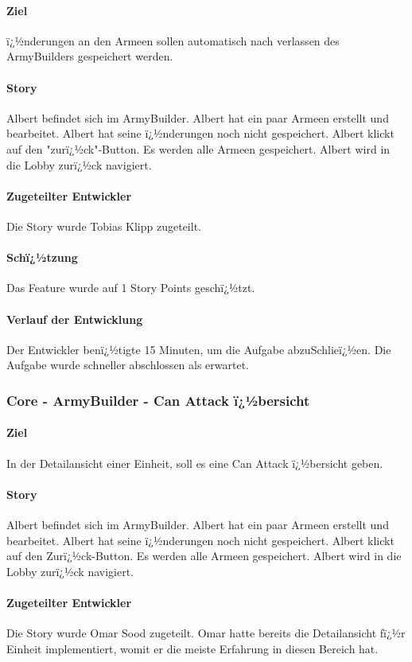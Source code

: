 \documentclass[12pt, titlepage]{scrartcl}
\begin{document}
			\paragraph{Ziel} ï¿½nderungen an den Armeen sollen automatisch nach verlassen des ArmyBuilders gespeichert werden.
			\paragraph{Story} Albert befindet sich im ArmyBuilder. Albert hat ein paar Armeen erstellt und bearbeitet. Albert hat seine ï¿½nderungen noch nicht gespeichert. Albert klickt auf den "zurï¿½ck"-Button. Es werden alle Armeen gespeichert. Albert wird in die Lobby zurï¿½ck navigiert.
			\paragraph{Zugeteilter Entwickler} Die Story wurde Tobias Klipp zugeteilt.
			\paragraph{Schï¿½tzung}
			Das Feature wurde auf 1 Story Points geschï¿½tzt.
			\paragraph{Verlauf der Entwicklung} 
			Der Entwickler benï¿½tigte 15 Minuten, um die Aufgabe abzuSchlieï¿½en. Die Aufgabe wurde schneller abschlossen als erwartet.
			\subsubsection{Core - ArmyBuilder - Can Attack ï¿½bersicht}
			\paragraph{Ziel} In der Detailansicht einer Einheit, soll es eine Can Attack ï¿½bersicht geben.
			\paragraph{Story} Albert befindet sich im ArmyBuilder. Albert hat ein paar Armeen erstellt und bearbeitet. Albert hat seine ï¿½nderungen noch nicht gespeichert. Albert klickt auf den Zurï¿½ck-Button. Es werden alle Armeen gespeichert. Albert wird in die Lobby zurï¿½ck navigiert.
			\paragraph{Zugeteilter Entwickler} Die Story wurde Omar Sood zugeteilt. Omar hatte bereits die Detailansicht fï¿½r Einheit implementiert, womit er die meiste Erfahrung in diesen Bereich hat.
\end{document}
